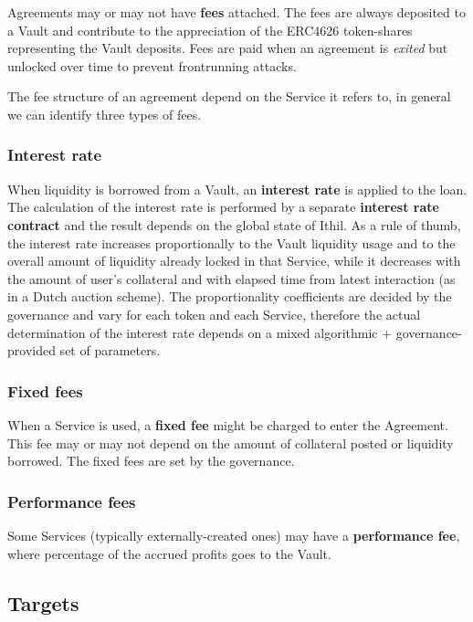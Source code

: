 \documentclass[a4paper,10 pt]{article}
\theoremstyle{definition}
\begin{document}
Agreements may or may not have {\bf fees} attached. The fees are always deposited to a Vault and contribute to the appreciation of the ERC4626 token-shares representing the Vault deposits. Fees are paid when an agreement is {\it exited} but unlocked over time to prevent frontrunning attacks.

The fee structure of an agreement depend on the Service it refers to, in general we can identify three types of fees.

\subsubsection{Interest rate}\label{interestRateSubSub}
When liquidity is borrowed from a Vault, an {\bf interest rate} is applied to the loan. The calculation of the interest rate is performed by a separate {\bf interest rate contract} and the result depends on the global state of Ithil. As a rule of thumb, the interest rate increases proportionally to the Vault liquidity usage and to the overall amount of liquidity already locked in that Service, while it decreases with the amount of user's collateral and with elapsed time from latest interaction (as in a Dutch auction scheme). The proportionality coefficients are decided by the governance and vary for each token and each Service, therefore the actual determination of the interest rate depends on a mixed algorithmic + governance-provided set of parameters.

\subsubsection{Fixed fees}\label{fixedFeesSubSub}
When a Service is used, a {\bf fixed fee} might be charged to enter the Agreement. This fee may or may not depend on the amount of collateral posted or liquidity borrowed. The fixed fees are set by the governance.

\subsubsection{Performance fees}\label{fixedFeesSubSub}
Some Services (typically externally-created ones) may have a {\bf performance fee}, where percentage of the accrued profits goes to the Vault.

\subsection{Targets}\label{targetsSub}
\end{document}
